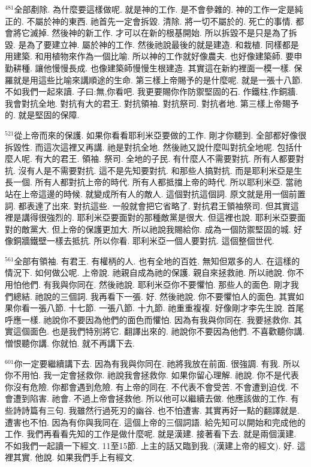 \documentclass{book}
\begin{document}
$^{481}$全部剷除.
為什麼要這樣做呢.
就是神的工作.
是不會參雜的.
神的工作一定是純正的.
不屬於神的東西.
祂首先一定會拆毀.
清除.
將一切不屬於的.
死亡的事情.
都會將它滅掉.
然後神的新工作.
才可以在新的根基開始.
所以拆毀不是只是為了拆毀.
是為了要建立神.
屬於神的工作.
然後祂說最後的就是建造.
和栽植.
同樣都是用建築.
和用植物來作為一個比喻.
所以神的工作就好像農夫.
也好像建築師.
要申勤耕種.
讓他慢慢長成.
也像建築師慢慢生根建造.
其實這在新約裡面一模一樣.
保羅就是用這些比喻來講順途的生命.
第三樣上帝賜予的是什麼呢.
就是一張十八節.
不如我們一起來讀.
子曰:無,你看吧.
我更要賜你作防禦堅固的石.
作鐵柱,作銅牆.
我會對抗全地.
對抗有大的君王.
對抗領袖.
對抗祭司.
對抗者地.
第三樣上帝賜予的.
就是堅固的保障.

$^{521}$從上帝而來的保護.
如果你看看耶利米亞要做的工作.
剛才你聽到.
全部都好像很拆毀性.
而這次這裡又再講.
祂是對抗全地.
然後祂又說什麼叫對抗全地呢.
包括什麼人呢.
有大的君王.
領袖.
祭司.
全地的子民.
有什麼人不需要對抗.
所有人都要對抗.
沒有人是不需要對抗.
這不是先知要對抗.
和那些人搞對抗.
而是耶利米亞是生長一個.
所有人都對抗上帝的時代.
所有人都抵擋上帝的時代.
所以耶利米亞.
當祂站在上帝這邊的時候.
就變成所有人的敵人.
這個對抗這個詞.
原文就是用一個前置詞.
都表達了出來.
對抗這些.
一般就會把它省略了.
對抗君王領袖祭司.
但其實這裡是講得很強烈的.
耶利米亞要面對的那種敵黨是很大.
但這裡也說.
耶利米亞要面對的敵黨大.
但上帝的保護更加大.
所以祂說我賜給你.
成為一個防禦堅固的城.
好像銅牆鐵壁一樣去抵抗.
所以你看.
耶利米亞一個人要對抗.
這個整個世代.

$^{561}$全部有領袖.
有君王.
有權柄的人.
也有全地的百姓.
無知但眾多的人.
在這樣的情況下.
如何做公呢.
上帝說.
祂親自成為祂的保護.
親自來拯救祂.
所以祂說.
你不用怕他們.
有我與你同在.
然後祂說.
耶利米亞你不要懼怕.
那些人的面色.
剛才我們總結.
祂說的三個詞.
我再看下一張.
好.
然後祂說.
你不要懼怕人的面色.
其實如果你看一張八節.
十七節.
一張八節.
十九節.
祂重重複複.
好像剛才李先生說.
首尾呼應一樣.
祂說你不要因為他們的面色而懼怕.
因為有我與你同在.
我要拯救你.
其實這個面色.
也是我們特別將它.
翻譯出來的.
祂說你不要因為他們.
不喜歡聽你講.
憎恨聽你講.
你就怕.
就不再講下去.

$^{601}$你一定要繼續講下去.
因為有我與你同在.
祂將我放在前面.
很強調.
有我.
所以你不用怕.
我一定會拯救你.
祂說我會拯救你.
如果你留心理解.
祂說.
你不是代表你沒有危險.
你都會遇到危險.
有上帝的同在.
不代表不會受苦.
不會遭到迫伐.
不會遭到陷害.
祂會.
不過上帝會拯救他.
所以他可以繼續去做.
他應該做的工作.
有些詩詩篇有三句.
我雖然行過死刃的幽谷.
也不怕遭害.
其實再好一點的翻譯就是.
遭害也不怕.
因為有你與我同在.
這個上帝的三個詞語.
給先知可以開始和完成他的工作.
我們再看看先知的工作是做什麼呢.
就是漢建.
接著看下去.
就是兩個漢建.
不如我們一起讀一下經文.
11至15節.
上主的話又臨到我.
(漢建上帝的經文).
好.
這裡其實.
他說.
如果我們手上有經文.
\end{document}
